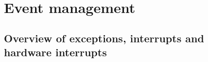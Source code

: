 
%
%

\chapter{Event management}

%
%

\section{Overview of exceptions, interrupts and hardware interrupts}


